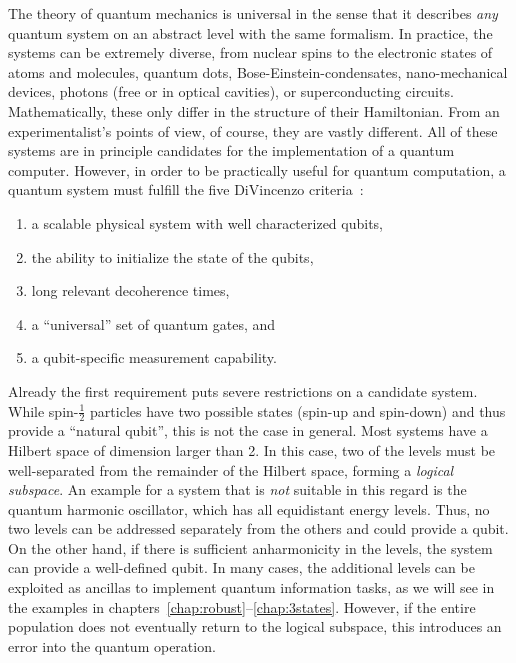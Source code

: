 The theory of quantum mechanics is universal in the sense that
it describes \emph{any} quantum system on an abstract level with the same
formalism. In practice, the
systems can be extremely diverse, from nuclear spins to the electronic states of
atoms and molecules, quantum dots, Bose-Einstein-condensates, nano-mechanical
devices, photons (free or in optical cavities), or superconducting circuits.
Mathematically, these only differ in the structure of their Hamiltonian.
From an experimentalist's points of view, of course, they are vastly
different. All of these systems are in principle candidates for the
implementation of a quantum computer.  However, in order to be practically
useful for quantum computation, a quantum system must
fulfill the five DiVincenzo criteria~\cite{DiVincenzoFP00}:
%
\begin{enumerate}
  \item a scalable physical system with well characterized qubits,
        \label{DVC:qubits}
  \item the ability to initialize the state of the qubits,
        \label{DVC:initialization}
  \item long relevant decoherence times,
        \label{DVC:decoherence}
  \item a ``universal'' set of quantum gates, and
        \label{DVC:universal}
  \item a qubit-specific measurement capability.
        \label{DVC:measurement}
\end{enumerate}

Already the first requirement puts severe restrictions on a candidate system.
While spin-$\frac{1}{2}$ particles have two possible states (spin-up and
spin-down) and thus provide a ``natural qubit'', this is not the case in
general. Most systems have a Hilbert space of dimension larger than 2. In this
case, two of the levels must be well-separated from the remainder of the Hilbert
space, forming a \emph{logical subspace}.
%
An example for a system that is \emph{not} suitable in
this regard is the quantum harmonic oscillator, which has all equidistant energy
levels. Thus, no two levels can be addressed separately from the others and
could provide a qubit. On the other hand, if there is sufficient anharmonicity
in the levels, the system can provide a well-defined qubit. In many cases, the
additional levels can be exploited as ancillas to implement quantum information
tasks, as we will see in the examples in
chapters~\ref{chap:robust}--\ref{chap:3states}. However, if the entire population
does not eventually return to the logical subspace, this introduces an error
into the quantum operation.

